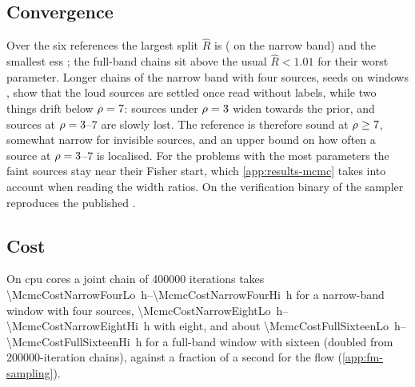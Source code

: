 \subsection{Convergence}
\label{app:mcmc-convergence}

Over the six references the largest split $\hat R$ \citep{gelman1992inference} is
\ResultsMcmcRhatMax{} (\ResultsMcmcRhatNarrowMax{} on the narrow band) and the smallest \ac{ess}
\ResultsMcmcEssMin{}; the full-band chains sit above the usual $\hat R<1.01$ for their worst
parameter. Longer chains of the narrow band with four sources, \McmcConvSeeds{} seeds on
windows \McmcConvRuns, show that the loud sources are settled once read without labels, while
two things drift below $\rho=7$: sources under $\rho=3$ widen towards the prior, and sources at
$\rho=3$--7 are slowly lost. The reference is therefore sound at $\rho\ge7$, somewhat narrow for
invisible sources, and an upper bound on how often a source at $\rho=3$--7 is localised. For the
problems with the most parameters the faint sources stay near their Fisher start, which
\cref{app:results-mcmc} takes into account when reading the width ratios. On the verification binary of
\citet{strub2022bayesian} the sampler reproduces the published .

\subsection{Cost}
\label{app:mcmc-cost}

On \McmcJointCores{} \acs{cpu} cores a joint chain of \num{400000} iterations takes
\qtyrange{\McmcCostNarrowFourLo}{\McmcCostNarrowFourHi}{\hour} for a narrow-band window with four
sources, \qtyrange{\McmcCostNarrowEightLo}{\McmcCostNarrowEightHi}{\hour} with eight, and about
\qtyrange{\McmcCostFullSixteenLo}{\McmcCostFullSixteenHi}{\hour} for a full-band window with sixteen
(doubled from \num{200000}-iteration chains), against a fraction of a second for the flow
(\cref{app:fm-sampling}).
